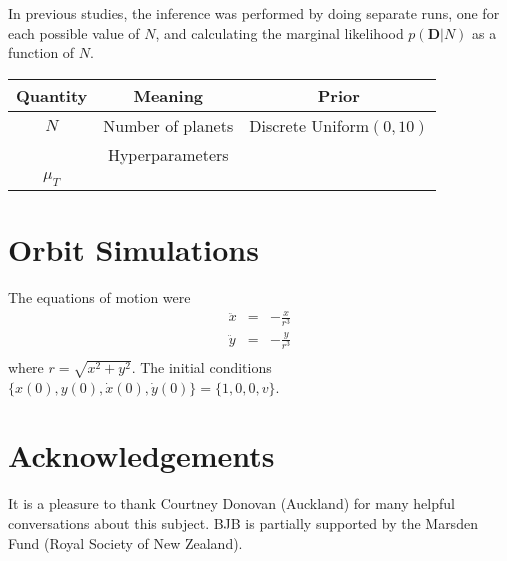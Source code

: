\documentclass[useAMS,usenatbib]{mn2e}
\begin{document}
In previous studies, the inference was performed by doing separate runs, one
for each possible value of $N$, and calculating the marginal likelihood
$p(\boldsymbol{D} | N)$ as a function of $N$.

\begin{table*}
\begin{tabular}{|c|c|c|}
\hline
Quantity	&	Meaning		& Prior\\
\hline
$N$		& Number of planets	& Discrete Uniform$(0, 10)$\\
\hline
		&	Hyperparameters	&	\\
$\mu_T$		&			&	\\
\end{tabular}
\end{table*}

\section{Orbit Simulations}

The equations of motion were
\begin{eqnarray}
\ddot{x} &=& -\frac{x}{r^3} \\
\ddot{y} &=& -\frac{y}{r^3} \\
\end{eqnarray}
where $r = \sqrt{x^2 + y^2}$. The initial conditions
$\{x(0), y(0), \dot{x}(0), \dot{y}(0)\} = \{1, 0, 0, v\}$.

\vspace{-0.5cm}
\section*{Acknowledgements}
It is a pleasure to thank Courtney Donovan (Auckland) for many helpful
conversations about this subject. BJB is partially
supported by the Marsden Fund (Royal Society of New Zealand).

\begin{thebibliography}{99}
\end{thebibliography}
\end{document}
